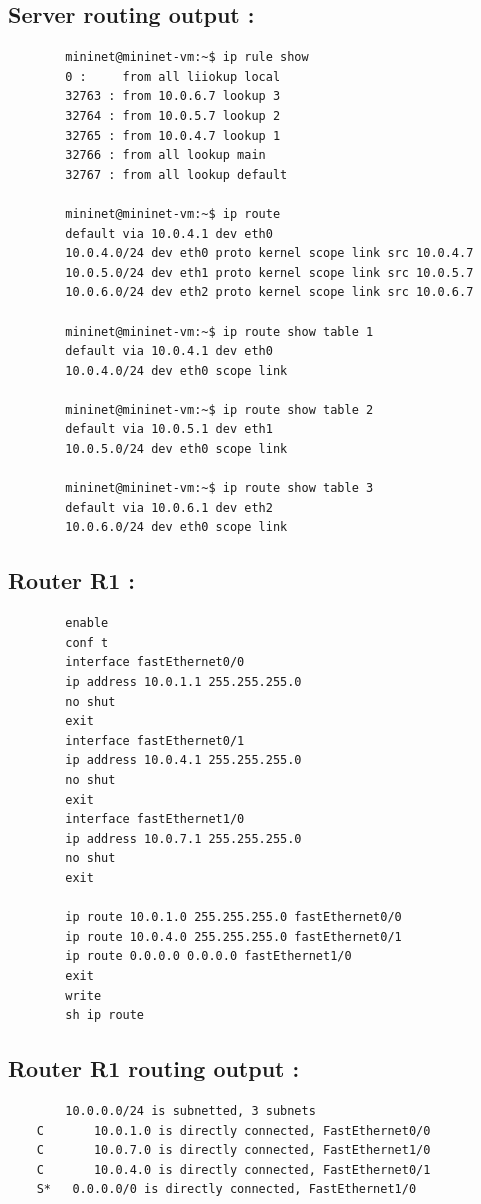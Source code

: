 \documentclass[a4paper,11pt]{article}
\begin{document}
	 	\subsection{Server routing output :}
	 	\label{subsec:serverrouteout}
	 	\begin{lstlisting}
	 	mininet@mininet-vm:~$ ip rule show
	 	0 : 	from all liiokup local
	 	32763 : from 10.0.6.7 lookup 3
	 	32764 : from 10.0.5.7 lookup 2
	 	32765 : from 10.0.4.7 lookup 1
	 	32766 : from all lookup main
	 	32767 : from all lookup default

	 	mininet@mininet-vm:~$ ip route
	 	default via 10.0.4.1 dev eth0
	 	10.0.4.0/24 dev eth0 proto kernel scope link src 10.0.4.7
	 	10.0.5.0/24 dev eth1 proto kernel scope link src 10.0.5.7
	 	10.0.6.0/24 dev eth2 proto kernel scope link src 10.0.6.7

	 	mininet@mininet-vm:~$ ip route show table 1
	 	default via 10.0.4.1 dev eth0
	 	10.0.4.0/24 dev eth0 scope link

	 	mininet@mininet-vm:~$ ip route show table 2
	 	default via 10.0.5.1 dev eth1
	 	10.0.5.0/24 dev eth0 scope link

	 	mininet@mininet-vm:~$ ip route show table 3
	 	default via 10.0.6.1 dev eth2
	 	10.0.6.0/24 dev eth0 scope link
	 	\end{lstlisting}

	 	\subsection{Router R1 :}
	 	\label{subsec:routerconf1}
	 	\begin{lstlisting}
	 	enable
	 	conf t
	 	interface fastEthernet0/0
	 	ip address 10.0.1.1 255.255.255.0
	 	no shut
	 	exit
	 	interface fastEthernet0/1
	 	ip address 10.0.4.1 255.255.255.0
	 	no shut
	 	exit
	 	interface fastEthernet1/0
	 	ip address 10.0.7.1 255.255.255.0
	 	no shut
	 	exit

	 	ip route 10.0.1.0 255.255.255.0 fastEthernet0/0
	 	ip route 10.0.4.0 255.255.255.0 fastEthernet0/1
	 	ip route 0.0.0.0 0.0.0.0 fastEthernet1/0
	 	exit
	 	write
	 	sh ip route
	 	\end{lstlisting}

	 	\subsection{Router R1 routing output :}
	 	\label{subsec:routerconfout1}
	 	\begin{lstlisting}
	 	10.0.0.0/24 is subnetted, 3 subnets
	C       10.0.1.0 is directly connected, FastEthernet0/0
	C       10.0.7.0 is directly connected, FastEthernet1/0
	C       10.0.4.0 is directly connected, FastEthernet0/1
	S*   0.0.0.0/0 is directly connected, FastEthernet1/0
	 	\end{lstlisting}
\end{document}
